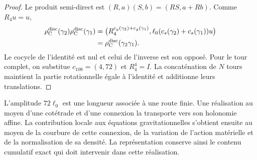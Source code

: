 \begin{proof}
Le produit semi-direct est
\((R,a)(S,b)=(RS,a+Rb)\). Comme \(R_4u=u\),
\[
\begin{split}
 \rho_{\rm C}^{\rm disc}(\gamma_2)
 \rho_{\rm C}^{\rm disc}(\gamma_1)
 &=
 \bigl(R_4^{c_g(\gamma_2)+c_g(\gamma_1)},
 \ell_0(c_s(\gamma_2)+c_s(\gamma_1))u\bigr)\\
 &=\rho_{\rm C}^{\rm disc}(\gamma_2\gamma_1).
\end{split}
\]
Le cocycle de l'identité est nul et celui de l'inverse est son opposé.
Pour le tour complet, on substitue \(c_{108}=(4,72)\) et
\(R_4^4=I\). La concaténation de \(N\) tours maintient la partie
rotationnelle égale à l'identité et additionne leurs translations.
\end{proof}

L'amplitude \(72\ell_0\) est une longueur associée à une route finie. Une réalisation au moyen d'une cotétrade et d'une connexion la transporte vers son holonomie affine. La contribution locale aux équations gravitationnelles s'obtient ensuite au moyen de la courbure de cette connexion, de la variation de l'action matérielle et de la normalisation de sa densité. La représentation conserve ainsi le contenu cumulatif exact qui doit intervenir dans cette réalisation.
